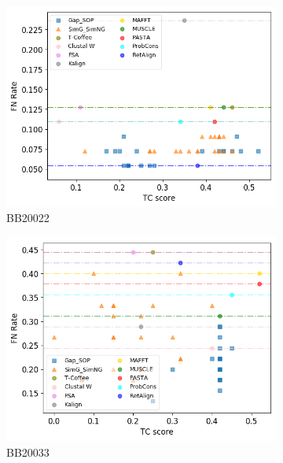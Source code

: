 \begin{figure}[!htbp]
\begin{adjustwidth}{-1cm}{-1cm}
		\begin{subfigure}{0.22\textwidth}
			\includegraphics[width=\columnwidth]{Figure/summary/precomputedInit/Balibase/BB20022_fnrate_vs_tc_2}
			\caption{BB20022}
		\end{subfigure}
		\begin{subfigure}{0.22\textwidth}
			\includegraphics[width=\columnwidth]{Figure/summary/precomputedInit/Balibase/BB20033_fnrate_vs_tc_2}
			\caption{BB20033}
		\end{subfigure}	
		\begin{subfigure}{0.22\textwidth}

\end{subfigure}
\end{adjustwidth}
\end{figure}
